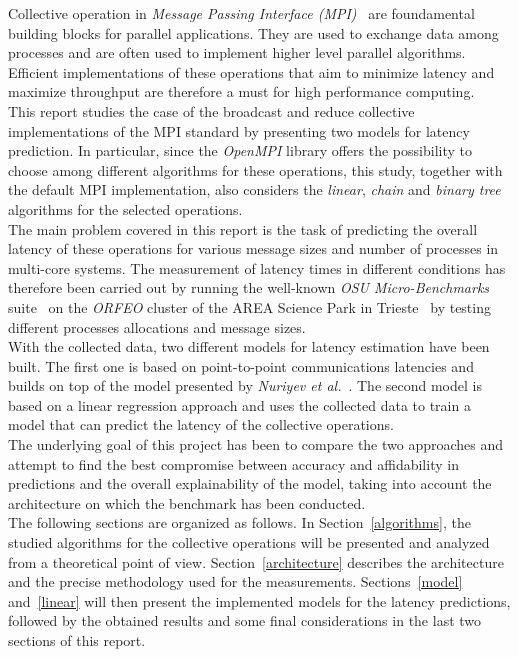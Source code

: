 \documentclass[../main.tex]{subfiles}
\begin{document}
Collective operation in \textit{Message Passing Interface (MPI)}~\cite{mpi} are foundamental building blocks for parallel applications. They are used to exchange data among processes and are often used to implement higher level parallel algorithms. Efficient implementations of these operations that aim to minimize latency and maximize throughput are therefore a must for high performance computing.\\
This report studies the case of the broadcast and reduce collective implementations of the MPI standard by presenting two models for latency prediction. In particular, since the \textit{OpenMPI} library offers the possibility to choose among different algorithms for these operations, this study, together with the default MPI implementation, also considers the \textit{linear}, \textit{chain} and \textit{binary tree} algorithms for the selected operations.\\
The main problem covered in this report is the task of predicting the overall latency of these operations for various message sizes and number of processes in multi-core systems. The measurement of latency times in different conditions has therefore been carried out by running the well-known \textit{OSU Micro-Benchmarks} suite~\cite{osu} on the \textit{ORFEO} cluster of the AREA Science Park in Trieste~\cite{orfeo} by testing different processes allocations and message sizes.\\
With the collected data, two different models for latency estimation have been built. The first one is based on point-to-point communications latencies and builds on top of the model presented by \textit{Nuriyev et al.}~\cite{Nuriyev2022}. The second model is based on a linear regression approach and uses the collected data to train a model that can predict the latency of the collective operations.\\
The underlying goal of this project has been to compare the two approaches and attempt to find the best compromise between accuracy and affidability in predictions and the overall explainability of the model, taking into account the architecture on which the benchmark has been conducted.\\
The following sections are organized as follows. In Section~\ref{algorithms}, the studied algorithms for the collective operations will be presented and analyzed from a theoretical point of view. Section~\ref{architecture} describes the architecture and the precise methodology used for the measurements. Sections~\ref{model} and~\ref{linear} will then present the implemented models for the latency predictions, followed by the obtained results and some final considerations in the last two sections of this report.\\
\end{document}
